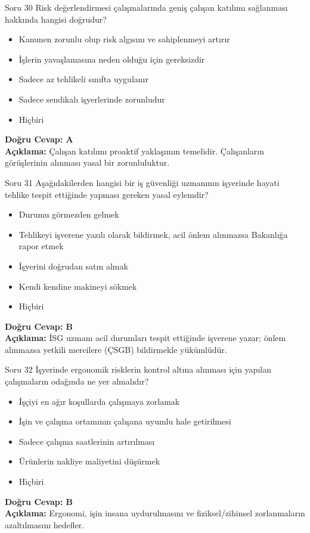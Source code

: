 \documentclass[12pt,a4paper]{article}
\begin{document}
\begin{testcard}{Soru 30}
    Risk değerlendirmesi çalışmalarında geniş çalışan katılımı sağlanması hakkında hangisi doğrudur?
    \begin{itemize}
        \item[A)] Kanunen zorunlu olup risk algısını ve sahiplenmeyi artırır
        \item[B)] İşlerin yavaşlamasına neden olduğu için gereksizdir
        \item[C)] Sadece az tehlikeli sınıfta uygulanır
        \item[D)] Sadece sendikalı işyerlerinde zorunludur
        \item[E)] Hiçbiri
    \end{itemize}
    \tcblower
    \textbf{Doğru Cevap: A} \\
    \textbf{Açıklama:} Çalışan katılımı proaktif yaklaşımın temelidir. Çalışanların görüşlerinin alınması yasal bir zorunluluktur.
\end{testcard}

\begin{testcard}{Soru 31}
    Aşağıdakilerden hangisi bir iş güvenliği uzmanının işyerinde hayati tehlike tespit ettiğinde yapması gereken yasal eylemdir?
    \begin{itemize}
        \item[A)] Durumu görmezden gelmek
        \item[B)] Tehlikeyi işverene yazılı olarak bildirmek, acil önlem alınmazsa Bakanlığa rapor etmek
        \item[C)] İşyerini doğrudan satın almak
        \item[D)] Kendi kendine makineyi sökmek
        \item[E)] Hiçbiri
    \end{itemize}
    \tcblower
    \textbf{Doğru Cevap: B} \\
    \textbf{Açıklama:} İSG uzmanı acil durumları tespit ettiğinde işverene yazar; önlem alınmazsa yetkili mercilere (ÇSGB) bildirmekle yükümlüdür.
\end{testcard}

\begin{testcard}{Soru 32}
    İşyerinde ergonomik risklerin kontrol altına alınması için yapılan çalışmaların odağında ne yer almalıdır?
    \begin{itemize}
        \item[A)] İşçiyi en ağır koşullarda çalışmaya zorlamak
        \item[B)] İşin ve çalışma ortamının çalışana uyumlu hale getirilmesi
        \item[C)] Sadece çalışma saatlerinin artırılması
        \item[D)] Ürünlerin nakliye maliyetini düşürmek
        \item[E)] Hiçbiri
    \end{itemize}
    \tcblower
    \textbf{Doğru Cevap: B} \\
    \textbf{Açıklama:} Ergonomi, işin insana uydurulmasını ve fiziksel/zihinsel zorlanmaların azaltılmasını hedefler.
\end{testcard}
\end{document}
